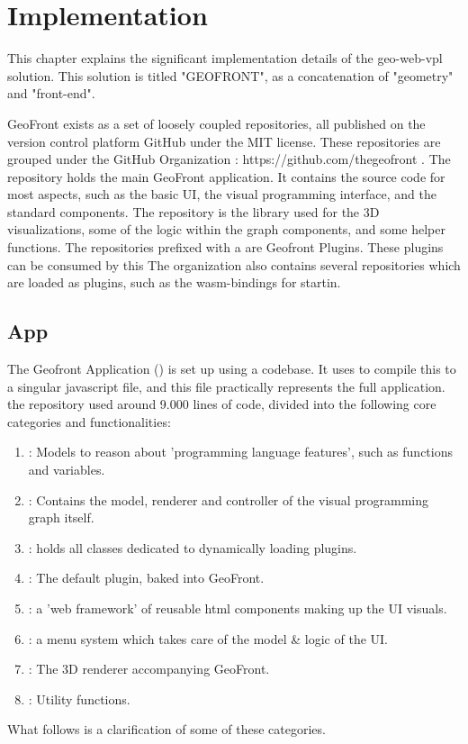 \chapter{Implementation}%

This chapter explains the significant implementation details of the geo-web-vpl solution.
This solution is titled "GEOFRONT", as a concatenation of "geometry" and "front-end".

GeoFront exists as a set of loosely coupled repositories, all published on the version control platform GitHub under the MIT license. These repositories are grouped under the GitHub Organization  : https://github.com/thegeofront .
The  repository holds the main GeoFront application. It contains the source code for most aspects, such as the basic UI, the visual programming interface, and the standard components. 
The  repository is the library used for the 3D visualizations, some of the logic within the graph components, and some helper functions.
The repositories prefixed with a  are Geofront Plugins. These plugins can be consumed by this 
The  organization also contains several repositories which are loaded as plugins, such as the wasm-bindings for startin.

\section{App}
The Geofront Application () is set up using a  codebase. It uses  to compile this to a singular javascript file, and this file practically represents the full application. 
the repository used around 9.000 lines of code, divided into the following core categories and functionalities:
\begin{enumerate}[I]
  \item {}: Models to reason about 'programming language features', such as functions and variables.
  \item {}: Contains the model, renderer and controller of the visual programming graph itself.  
  \item {}: holds all classes dedicated to dynamically loading plugins.
  \item {}: The default plugin, baked into GeoFront.   
  \item {}: a 'web framework' of reusable html components making up the UI visuals.
  \item {}: a menu system which takes care of the model \& logic of the UI.
  \item {}: The 3D renderer accompanying GeoFront.
  \item {}: Utility functions.   
\end{enumerate}
What follows is a clarification of some of these categories.

